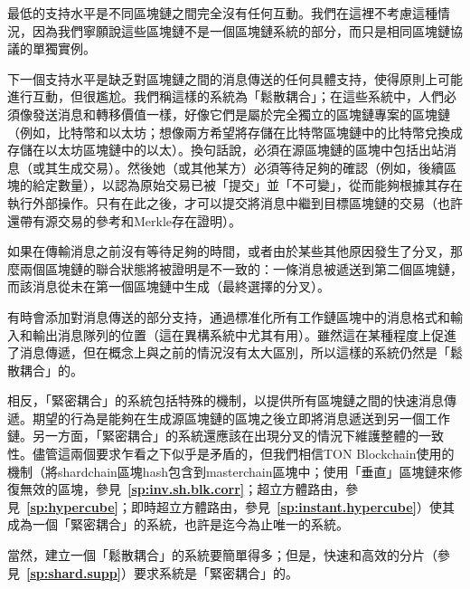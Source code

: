 \documentclass[12pt,oneside]{article}
\def\refpoint#1{{\rm\textbf{\ref{#1}}}}
\let\ptref=\refpoint
\begin{document}
最低的支持水平是不同區塊鏈之間完全沒有任何互動。我們在這裡不考慮這種情況，因為我們寧願說這些區塊鏈不是一個區塊鏈系統的部分，而只是相同區塊鏈協議的單獨實例。

下一個支持水平是缺乏對區塊鏈之間的消息傳送的任何具體支持，使得原則上可能進行互動，但很尷尬。我們稱這樣的系統為「鬆散耦合」；在這些系統中，人們必須像發送消息和轉移價值一樣，好像它們是屬於完全獨立的區塊鏈專案的區塊鏈（例如，比特幣和以太坊；想像兩方希望將存儲在比特幣區塊鏈中的比特幣兌換成存儲在以太坊區塊鏈中的以太）。換句話說，必須在源區塊鏈的區塊中包括出站消息（或其生成交易）。然後她（或其他某方）必須等待足夠的確認（例如，後續區塊的給定數量），以認為原始交易已被「提交」並「不可變」，從而能夠根據其存在執行外部操作。只有在此之後，才可以提交將消息中繼到目標區塊鏈的交易（也許還帶有源交易的參考和Merkle存在證明）。

如果在傳輸消息之前沒有等待足夠的時間，或者由於某些其他原因發生了分叉，那麼兩個區塊鏈的聯合狀態將被證明是不一致的：一條消息被遞送到第二個區塊鏈，而該消息從未在第一個區塊鏈中生成（最終選擇的分叉）。

有時會添加對消息傳送的部分支持，通過標准化所有工作鏈區塊中的消息格式和輸入和輸出消息隊列的位置（這在異構系統中尤其有用）。雖然這在某種程度上促進了消息傳遞，但在概念上與之前的情況沒有太大區別，所以這樣的系統仍然是「鬆散耦合」的。

相反，「緊密耦合」的系統包括特殊的機制，以提供所有區塊鏈之間的快速消息傳遞。期望的行為是能夠在生成源區塊鏈的區塊之後立即將消息遞送到另一個工作鏈。另一方面，「緊密耦合」的系統還應該在出現分叉的情況下維護整體的一致性。儘管這兩個要求乍看之下似乎是矛盾的，但我們相信TON Blockchain使用的機制（將shardchain區塊hash包含到masterchain區塊中；使用「垂直」區塊鏈來修復無效的區塊，參見~\ptref{sp:inv.sh.blk.corr}；超立方體路由，參見~\ptref{sp:hypercube}；即時超立方體路由，參見~\ptref{sp:instant.hypercube}）使其成為一個「緊密耦合」的系統，也許是迄今為止唯一的系統。

當然，建立一個「鬆散耦合」的系統要簡單得多；但是，快速和高效的分片（參見~\ptref{sp:shard.supp}）要求系統是「緊密耦合」的。
\end{document}
